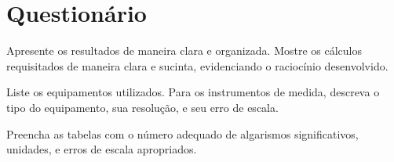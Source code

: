 
\vspace{15mm}

\begin{fullwidth}
\noindent{}
\vspace{5mm}

\noindent{}

\noindent{}

\noindent{}

\noindent{}

\noindent{}
\end{fullwidth}

\vspace{5mm}

\section{Questionário}

\begin{question}[type={exam}]{1}
Apresente os resultados de maneira clara e organizada. Mostre os cálculos requisitados de maneira clara e sucinta, evidenciando o raciocínio desenvolvido.
\end{question}

\begin{question}[type={exam}]{1}
Liste os equipamentos utilizados. Para os instrumentos de medida, descreva o tipo do equipamento, sua resolução, e seu erro de escala.
\end{question}

\begin{question}[type={exam}]{1}
Preencha as tabelas com o número adequado de algarismos significativos, unidades, e erros de escala apropriados. 
\end{question}

